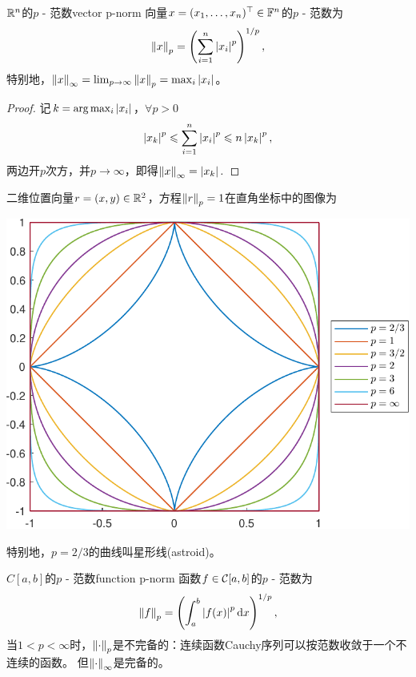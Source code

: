 \begin{example}
    {$\mathbb R^n$的$p$ - 范数}{vector p-norm}
    向量$x=(x_1,\ldots,x_n)^\top\in\mathbb F^n$的$p$ - 范数为
    \begin{equation}
        \label{eqn:p-norm vector}
        \left\lVert x\right\rVert_p=\left(\sum_{i=1}^n\left\lvert x_i\right\rvert^p\right)^{1/p},
    \end{equation}
    特别地，$\left\lVert x\right\rVert_\infty=\lim_{p\to\infty}\left\lVert x\right\rVert_p=\max_i\left\lvert x_i\right\rvert$。
    \begin{proof}
        记$k=\arg\max_i\left\lvert x_i\right\rvert$，$\forall p>0$
        \[
            \left\lvert x_k\right\rvert^p\leqslant\sum_{i=1}^n\left\lvert x_i\right\rvert^p\leqslant n\left\lvert x_k\right\rvert^p,
        \]
        两边开$p$次方，并$p\to\infty$，即得$\left\lVert x\right\rVert_\infty=\left\lvert x_k\right\rvert.$
    \end{proof}
    \tcblower
    二维位置向量$r=(x,y)\in\mathbb R^2$，方程$\left\lVert r\right\rVert_p=1$在直角坐标中的图像为
    \begin{center}
        \includegraphics[width=0.5\linewidth]{figures/Lpspace.pdf}
        \label{fig:Lp space}
    \end{center}
    特别地，$p=2/3$的曲线叫星形线(astroid)。
\end{example}

\begin{example}
    {$C[a,b]$的$p$ - 范数}{function p-norm}
    函数$f\in\mathcal C[a,b]$的$p$ - 范数为
    \begin{equation}
        \label{eqn:p-norm function}
        \left\lVert f\right\rVert_p=\left(\int_a^b\left\lvert f(x)\right\rvert^p\mathop{}\!\mathrm{d} x\right)^{1/p},
    \end{equation}
    当$1<p<\infty$时，$\left\lVert\cdot\right\rVert_p$是不完备的：连续函数Cauchy序列可以按范数收敛于一个不连续的函数。
    但$\left\lVert\cdot\right\rVert_\infty$是完备的。
\end{example}

